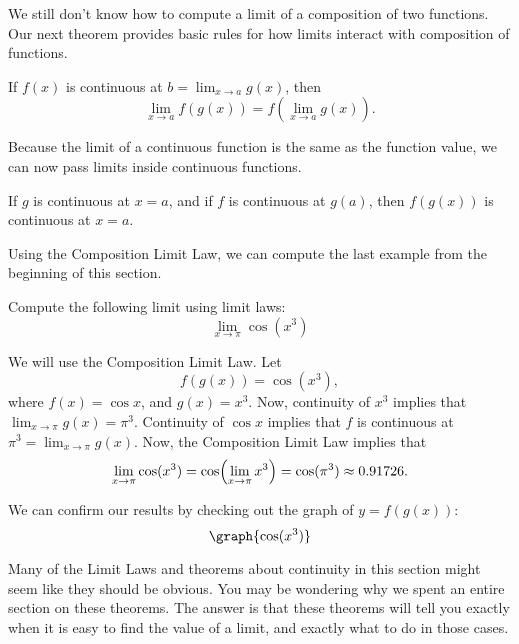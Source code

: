 \documentclass{ximera}
\begin{document}
We still don't know how to compute  a limit of a composition of two functions.
Our next theorem provides basic rules for how limits interact with composition
of functions.

\begin{theorem}
  If $f(x)$ is continuous at $b = \lim_{x\to a} g(x)$, then
  \[
  \lim_{x\to a} f(g(x)) = f(\lim_{x\to a} g(x)).
  \]
\end{theorem}

Because the limit of a continuous function is the same as the function
value, we can now pass limits inside continuous functions.

\begin{corollary}

If $g$ is continuous at $x=a$, and if $f $ is continuous at $g(a)$,  then $f(g(x))$ is continuous at $x=a$.



\end{corollary}
Using the Composition Limit Law, we can compute the last example from the beginning of this section.
\begin{example}
  Compute the following limit using limit laws:
  \[
  \lim_{x \to \pi}\cos({x^3})
  \]
  \begin{explanation}
  We will use the Composition Limit Law. 
Let
 \[ 
 f(g(x))=\cos({x^3}),
 \]
 where $f(x)=\cos{x}$, and $g(x)=x^3$.
  Now, continuity of $x^3$ implies that $\lim_{x \to \pi}g(x)=\pi^3$.
    Continuity of $\cos{x}$ implies that $f$ is continuous at $\pi^3=\lim_{x \to \pi}g(x)$.
     Now, the Composition Limit Law implies that
    \[
    \lim_{x \to \pi}\cos({x^3})= \cos\Bigl({\lim_{x \to \pi} x^3}\Bigr)=\cos({\pi^3})\approx 0.91726.
    \]
   
  \begin{onlineOnly}
    We can confirm our results by checking out the graph of $y=f(g(x))$:
    \[
    \graph{\cos({x^3})}
    \]
  \end{onlineOnly}
  \end{explanation}
\end{example}

Many of the Limit Laws and theorems about continuity in this section
might seem like they should be obvious.  You may be wondering why we
spent an entire section on these theorems.  The answer is that these
theorems will tell you exactly when it is easy to find the value of a
limit, and exactly what to do in those cases.
\end{document}
